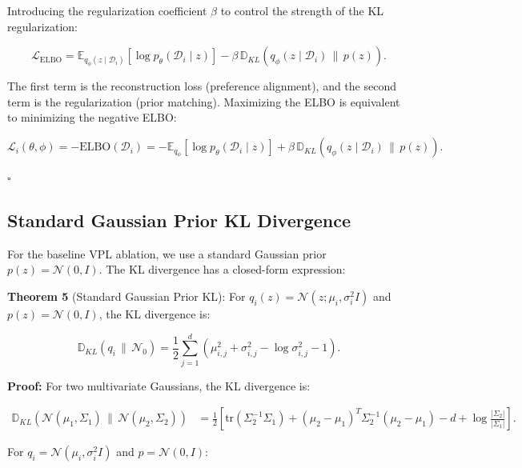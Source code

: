 Introducing the regularization coefficient $\beta$ to control the strength of the KL regularization:

\begin{equation}
\mathcal{L}_{\text{ELBO}} = \mathbb{E}_{q_\phi(z \mid \mathcal{D}_i)} \left[ \log p_\theta(\mathcal{D}_i \mid z) \right] - \beta \,\mathbb{D}_{KL}(q_\phi(z \mid \mathcal{D}_i) \,\|\, p(z)).
\end{equation}

The first term is the reconstruction loss (preference alignment), and the second term is the regularization (prior matching). Maximizing the ELBO is equivalent to minimizing the negative ELBO:

\begin{equation}
\mathcal{L}_i(\theta, \phi) = - \text{ELBO}(\mathcal{D}_i) = - \mathbb{E}_{q_\phi} \left[ \log p_\theta(\mathcal{D}_i \mid z) \right] + \beta \,\mathbb{D}_{KL}(q_\phi(z \mid \mathcal{D}_i) \,\|\, p(z)).
\end{equation}

$\square$

\subsection{Standard Gaussian Prior KL Divergence}

For the baseline VPL ablation, we use a standard Gaussian prior $p(z) = \mathcal{N}(0, I)$. The KL divergence has a closed-form expression:

\textbf{Theorem 5} (Standard Gaussian Prior KL): For $q_i(z) = \mathcal{N}(z; \mu_i, \sigma_i^2 I)$ and $p(z) = \mathcal{N}(0, I)$, the KL divergence is:

\begin{equation}
\mathbb{D}_{KL}(q_i \,\|\, \mathcal{N}_0) = \frac{1}{2} \sum_{j=1}^d \left( \mu_{i,j}^2 + \sigma_{i,j}^2 - \log \sigma_{i,j}^2 - 1 \right).
\end{equation}

\textbf{Proof:} For two multivariate Gaussians, the KL divergence is:

\begin{align}
\mathbb{D}_{KL}(\mathcal{N}(\mu_1, \Sigma_1) \,\|\, \mathcal{N}(\mu_2, \Sigma_2)) &= \frac{1}{2} \left[ \text{tr}(\Sigma_2^{-1} \Sigma_1) + (\mu_2 - \mu_1)^T \Sigma_2^{-1} (\mu_2 - \mu_1) - d + \log \frac{|\Sigma_2|}{|\Sigma_1|} \right].
\end{align}

For $q_i = \mathcal{N}(\mu_i, \sigma_i^2 I)$ and $p = \mathcal{N}(0, I)$:

